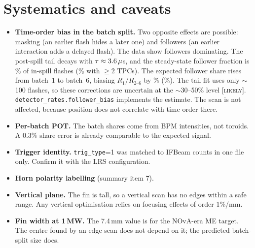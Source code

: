 \documentclass[11pt]{article}
\newcommand{\LIK}{\textsc{[likely]}}
\begin{document}
\section{Systematics and caveats}\label{sec:syst}
\begin{itemize}
\item \textbf{Time-order bias in the batch split.} Two opposite effects are possible:
masking (an earlier flash hides a later one) and followers (an earlier interaction adds a
delayed flash). The data show followers dominating. The post-spill tail decays with
$\tau\approx3.6\,\mu$s, and the steady-state follower fraction is \FBf\% of in-spill
flashes (\FBtwoF\% with $\geq$2 TPCs). The expected follower share rises from batch~1 to
batch~6, biasing $R_1/R_{2\text{--}6}$ by \FBbias\% (\FBtwoBias\%). The tail fit uses only
$\sim$100 flashes, so these corrections are uncertain at the $\sim$30--50\% level \LIK.
\texttt{detector\_rates.follower\_bias} implements the estimate. The scan is not affected,
because position does not correlate with time order there.
\item \textbf{Per-batch POT.} The batch shares come from BPM intensities, not toroids.
A 0.3\% share error is already comparable to the expected signal.
\item \textbf{Trigger identity.} \texttt{trig\_type}=1 was matched to IFBeam counts in one
file only. Confirm it with the LRS configuration.
\item \textbf{Horn polarity labelling} (summary item 7).
\item \textbf{Vertical plane.} The fin is tall, so a vertical scan has no edges within a
safe range. Any vertical optimisation relies on focusing effects of order 1\%/mm.
\item \textbf{Fin width at 1\,MW.} The 7.4\,mm value is for the NOvA-era ME target. The
centre found by an edge scan does not depend on it; the predicted batch-split size does.
\end{itemize}
\end{document}
